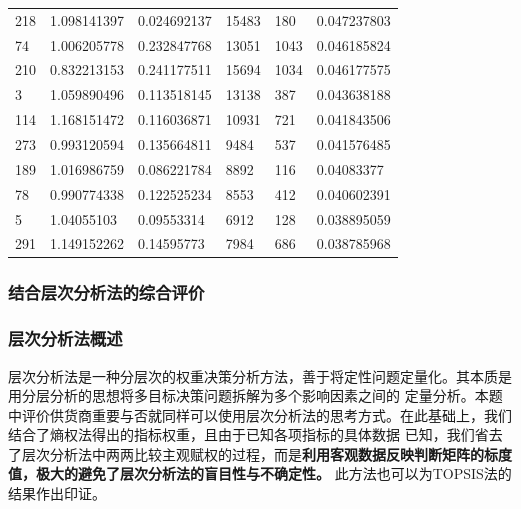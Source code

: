 \documentclass[withoutpreface,bwprint]{cumcmthesis}
\begin{document}
\begin{longtable}{l|llll|l}
    218  & 1.098141397  & 0.024692137  & 15483    & 180            & 0.047237803    \\
    74   & 1.006205778  & 0.232847768  & 13051    & 1043           & 0.046185824    \\
    210  & 0.832213153  & 0.241177511  & 15694    & 1034           & 0.046177575    \\
    3    & 1.059890496  & 0.113518145  & 13138    & 387            & 0.043638188    \\
    114  & 1.168151472  & 0.116036871  & 10931    & 721            & 0.041843506    \\
    273  & 0.993120594  & 0.135664811  & 9484     & 537            & 0.041576485    \\
    189  & 1.016986759  & 0.086221784  & 8892     & 116            & 0.04083377     \\
    78   & 0.990774338  & 0.122525234  & 8553     & 412            & 0.040602391    \\
    5    & 1.04055103   & 0.09553314   & 6912     & 128            & 0.038895059    \\
    291  & 1.149152262  & 0.14595773   & 7984     & 686            & 0.038785968    \\
    \bottomrule
\end{longtable}

\subsubsection{结合层次分析法的综合评价}

\subsubsection*{层次分析法概述}
层次分析法是一种分层次的权重决策分析方法，善于将定性问题定量化。其本质是用分层分析的思想将多目标决策问题拆解为多个影响因素之间的
定量分析。本题中评价供货商重要与否就同样可以使用层次分析法的思考方式。在此基础上，我们结合了熵权法得出的指标权重，且由于已知各项指标的具体数据
已知，我们省去了层次分析法中两两比较主观赋权的过程，而是\textbf{利用客观数据反映判断矩阵的标度值，极大的避免了层次分析法的盲目性与不确定性。}
此方法也可以为TOPSIS法的结果作出印证。
\end{document}
